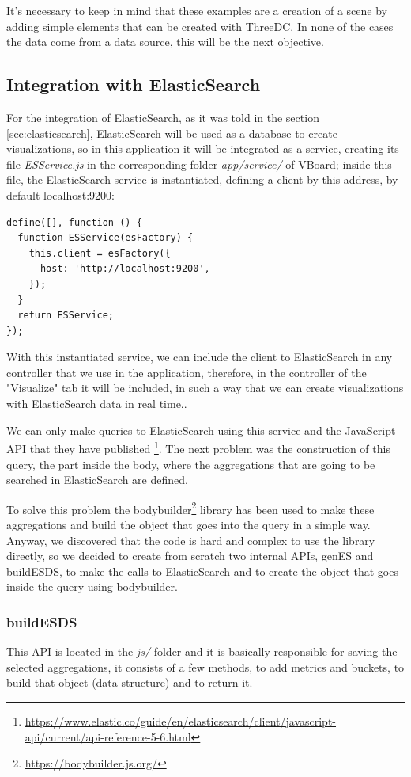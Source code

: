 \documentclass[a4paper, 12pt]{book}
\begin{document}
It's necessary to keep in mind that these examples are a creation of a scene by adding simple elements that can be created with ThreeDC. In none of the cases the data come from a data source, this will be the next objective.

\subsection{Integration with ElasticSearch}

For the integration of ElasticSearch, as it was told in the section \ref{sec:elasticsearch}, ElasticSearch will be used as a database to create visualizations, so in this application it will be integrated as a service, creating its file \textit{ESService.js} in the corresponding folder \textit{app/service/} of VBoard; inside this file, the ElasticSearch service is instantiated, defining a client by this address, by default localhost:9200:

\begin{lstlisting}[frame=single]
define([], function () {
  function ESService(esFactory) {
    this.client = esFactory({
      host: 'http://localhost:9200',
    });
  }
  return ESService;
});
\end{lstlisting}

With this instantiated service, we can include the client to ElasticSearch in any controller that we use in the application, therefore, in the controller of the "Visualize" tab it will be included, in such a way that we can create visualizations with ElasticSearch data in real time..

We can only make queries to ElasticSearch using this service and the JavaScript API that they have published \footnote{\url{https://www.elastic.co/guide/en/elasticsearch/client/javascript-api/current/api-reference-5-6.html}}. The next problem was the construction of this query, the part inside the body, where the aggregations that are going to be searched in ElasticSearch are defined.

To solve this problem the bodybuilder\footnote{\url{https://bodybuilder.js.org/}} library has been used to make these aggregations and build the object that goes into the query in a simple way. Anyway, we discovered that the code is hard and complex to use the library directly, so we decided to create from scratch two internal APIs, genES and buildESDS, to make the calls to ElasticSearch and to create the object that goes inside the query using bodybuilder.

\subsubsection{buildESDS}
This API is located in the \textit{js/} folder and it is basically responsible for saving the selected aggregations, it consists of a few methods, to add metrics and buckets, to build that object (data structure) and to return it.
\end{document}
